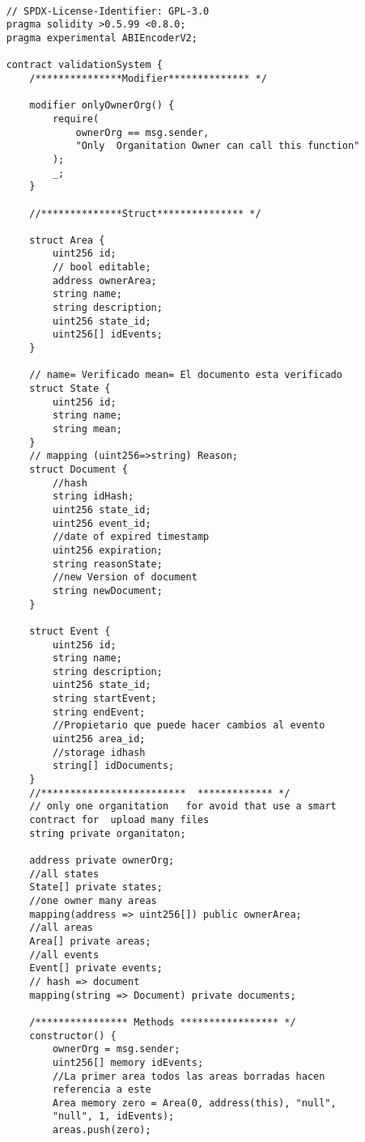 \begin{verbatim}

    // SPDX-License-Identifier: GPL-3.0
    pragma solidity >0.5.99 <0.8.0;
    pragma experimental ABIEncoderV2;
    
    contract validationSystem {
        /***************Modifier************** */
    
        modifier onlyOwnerOrg() {
            require(
                ownerOrg == msg.sender,
                "Only  Organitation Owner can call this function"
            );
            _;
        }
    
        //**************Struct*************** */
    
        struct Area {
            uint256 id;
            // bool editable;
            address ownerArea;
            string name;
            string description;
            uint256 state_id;
            uint256[] idEvents;
        }
    
        // name= Verificado mean= El documento esta verificado
        struct State {
            uint256 id;
            string name;
            string mean;
        }
        // mapping (uint256=>string) Reason;
        struct Document {
            //hash
            string idHash;
            uint256 state_id;
            uint256 event_id;
            //date of expired timestamp
            uint256 expiration;
            string reasonState;
            //new Version of document
            string newDocument;
        }
    
        struct Event {
            uint256 id;
            string name;
            string description;
            uint256 state_id;
            string startEvent;
            string endEvent;
            //Propietario que puede hacer cambios al evento
            uint256 area_id;
            //storage idhash
            string[] idDocuments;
        }
        //*************************  ************* */
        // only one organitation   for avoid that use a smart 
        contract for  upload many files
        string private organitaton;
    
        address private ownerOrg;
        //all states
        State[] private states;
        //one owner many areas
        mapping(address => uint256[]) public ownerArea;
        //all areas
        Area[] private areas;
        //all events
        Event[] private events;
        // hash => document
        mapping(string => Document) private documents;
    
        /**************** Methods ***************** */
        constructor() {
            ownerOrg = msg.sender;
            uint256[] memory idEvents;
            //La primer area todos las areas borradas hacen 
            referencia a este
            Area memory zero = Area(0, address(this), "null", 
            "null", 1, idEvents);
            areas.push(zero);
    

\end{verbatim}
